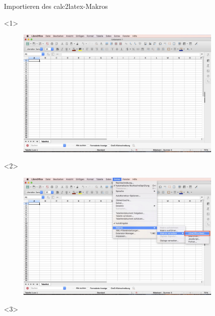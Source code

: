 \documentclass["WS\space 16-17\space -\space LaTeX-Kurs\space -\space Praesentation\space -\space 2.tex"]{subfiles}
\begin{document}
\begin{frame}[c]{Importieren des calc2latex-Makros}
	\begin{onlyenv}
		\begin{figure}[htbp]
			\centering
			\includegraphics[width=0.9\textwidth]{img/Bildschirmfoto_mitKasten/1_Importieren_Macro/1.jpg}
		\end{figure}
	\end{onlyenv}
	\begin{onlyenv}
		\begin{figure}[htbp]
			\centering
			\includegraphics[width=0.9\textwidth]{img/Bildschirmfoto_mitKasten/1_Importieren_Macro/2.jpg}
		\end{figure}
	\end{onlyenv}
	\begin{onlyenv}
		\begin{figure}[htbp]

\end{figure}
\end{onlyenv}
\end{frame}
\end{document}
